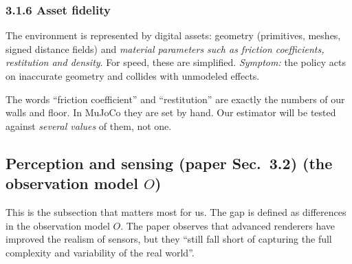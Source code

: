 \documentclass[11pt,a4paper]{article}
\begin{document}
\subsubsection*{3.1.6 Asset fidelity}
The environment is represented by digital assets: geometry (primitives, meshes, signed distance
fields) and \emph{material parameters such as friction coefficients, restitution and density}.
For speed, these are simplified. \emph{Symptom:} the policy acts on inaccurate geometry and
collides with unmodeled effects.

\begin{ours}
The words ``friction coefficient'' and ``restitution'' are exactly the numbers of our walls and
floor. In MuJoCo they are set by hand. Our estimator will be tested against \emph{several
values} of them, not one.
\end{ours}

\subsection{Perception and sensing \textnormal{(paper Sec.~3.2)} \textnormal{(the observation model $O$)}}
This is the subsection that matters most for us. The gap is defined as differences in the
observation model $O$. The paper observes that advanced renderers have improved the realism of
sensors, but they ``still fall short of capturing the full complexity and variability of the real
world''.
\end{document}
